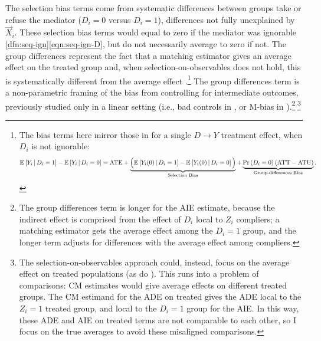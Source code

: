 The selection bias terms come from systematic differences between groups take or refuse the mediator ($D_i = 0$ versus $D_i = 1$), differences not fully unexplained by $\vec X_i$.
These selection bias terms would equal to zero if the mediator was ignorable \ref{dfn:seq-ign}\eqref{eqn:seq-ign-D}, but do not necessarily average to zero if not.
The group differences represent the fact that a matching estimator gives an average effect on the treated group and, when selection-on-observables does not hold, this is systematically different from the average effect \citep{heckman1998characterizing}.\footnote{
    The bias terms here mirror those in \cite{heckman1998characterizing,angrist2009mostly} for a single $D\to Y$ treatment effect, when $D_i$ is not ignorable:
    \[ \mathbb{E}_{} \left[  Y_i \, \middle\vert \, D_i =1 \right] - \mathbb{E}_{} \left[  Y_i \, \middle\vert \, D_i =0 \right]
        = \text{ATE}
        + \underbrace{\Big( \mathbb{E}_{} \left[  Y_i(0) \, \middle\vert \, D_i =1 \right] - \mathbb{E}_{} \left[  Y_i(0) \, \middle\vert \, D_i =0 \right] \Big)}_{
            \text{Selection Bias}}
        + \underbrace{ \Pr\left( D_i=0 \right) (\text{ATT}- \text{ATU}) }_{
            \text{Group-differences Bias}}. \]
}
The group differences term is a non-parametric framing of the bias from controlling for intermediate outcomes, previously studied only in a linear setting (i.e., bad controls in \citealt{cinelli2024crash}, or M-bias in \citealt{ding2015adjust}).\footnote{
    The group differences term is longer for the AIE estimate, because the indirect effect is comprised from the effect of $D_i$ local to $Z_i$ compliers; a matching estimator gets the average effect among the $D_i = 1$ group, and the longer term adjusts for differences with the average effect among compliers.
}$^{,}$\footnote{
    The selection-on-observables approach could, instead, focus on the average effect on treated populations (as do \citealt{keele2015identifying}).
    This runs into a problem of comparisons: CM estimates would give average effects on different treated groups.
    The CM estimand for the ADE on treated gives the ADE local to the $Z_i = 1$ treated group, and local to the $D_i = 1$ group for the AIE.
    In this way, these ADE and AIE on treated terms are not comparable to each other, so I focus on the true averages to avoid these misaligned comparisons.
}
